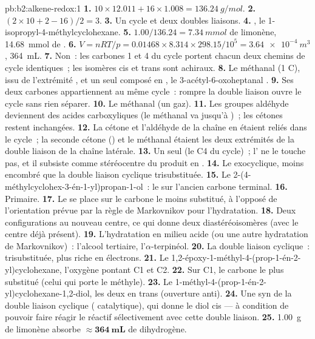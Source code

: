 \begin{solution}{pb:b2:alkene-redox:1}
\textbf{1.} $10 \times 12.011 + 16 \times 1.008 = \qty{136.24}{g/mol}$.
\textbf{2.} $(2 \times 10 + 2 - 16)/2 = 3$.
\textbf{3.} Un cycle et deux doubles liaisons.
\textbf{4.} , le 1-isopropyl-4-méthylcyclohexane.
\textbf{5.} $1.00/136.24 = \qty{7.34}{mmol}$ de limonène, \qty{14.68}{mmol} de .
\textbf{6.} $V = nRT/p = 0.01468 \times 8.314 \times 298.15/10^5 = \qty{3.64e-4}{m^3}$,
\qty{364}{mL}.
\textbf{7.} Non~: les carbones 1 et 4 du cycle portent chacun deux chemins de cycle identiques~; les isomères cis et
trans sont achiraux.
\textbf{8.} Le méthanal  (1 C), issu de l'extrémité , et un seul composé en ,
le 3-acétyl-6-oxoheptanal .
\textbf{9.} Ses deux carbones appartiennent au même cycle~: rompre la double liaison ouvre le cycle
sans rien séparer.
\textbf{10.} Le méthanal (un gaz).
\textbf{11.} Les groupes aldéhyde deviennent des acides carboxyliques (le méthanal va jusqu'à )~; les
cétones restent inchangées.
\textbf{12.} La cétone et l'aldéhyde de la chaîne en  étaient reliés dans le cycle~; la seconde
cétone () et le méthanal étaient les deux extrémités de la double liaison de la chaîne latérale.
\textbf{13.} Un seul (le C4 du cycle)~; l' ne le touche pas, et il subsiste comme
stéréocentre du produit en .
\textbf{14.} Le  exocyclique, moins encombré que la double liaison cyclique trisubstituée.
\textbf{15.} Le 2-(4-méthylcyclohex-3-én-1-yl)propan-1-ol~: le  sur l'ancien carbone
terminal.
\textbf{16.} Primaire.
\textbf{17.} Le  se place sur le carbone le moins substitué, à l'opposé de l'orientation
prévue par la règle de Markovnikov pour l'hydratation.
\textbf{18.} Deux configurations au nouveau centre, ce qui donne deux diastéréoisomères (avec le centre
déjà présent).
\textbf{19.} L'hydratation en milieu acide (ou une autre hydratation de Markovnikov)~: l'alcool tertiaire,
l'$\alpha$-terpinéol.
\textbf{20.} La double liaison cyclique~: trisubstituée, plus riche en électrons.
\textbf{21.} Le 1,2-époxy-1-méthyl-4-(prop-1-én-2-yl)cyclohexane, l'oxygène pontant C1 et C2.
\textbf{22.} Sur C1, le carbone le plus substitué (celui qui porte le méthyle).
\textbf{23.} Le 1-méthyl-4-(prop-1-én-2-yl)cyclohexane-1,2-diol, les deux  en trans (ouverture
anti).
\textbf{24.} Une  syn de la double liaison cyclique ( catalytique), qui donne le diol
cis --- à condition de pouvoir faire réagir le réactif sélectivement avec cette double liaison.
\textbf{25.} \qty{1.00}{g} de limonène absorbe $\boldsymbol{\approx \qty{364}{mL}}$ de
dihydrogène.
\end{solution}
